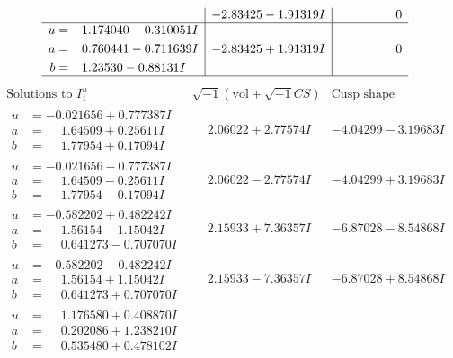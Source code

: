 \documentclass[1p]{elsarticle_modified}
\theoremstyle{definition}
\newcommand{\I}{\sqrt{-1}}
\begin{document}
$$\begin{array}{c|c|c}
 & -2.83425 - 1.91319 I & \phantom{-0.000000 } 0 \\ \hline\begin{aligned}
u &= -1.174040 - 0.310051 I \\
a &= \phantom{-}0.760441 - 0.711639 I \\
b &= \phantom{-}1.23530 - 0.88131 I\end{aligned}
 & -2.83425 + 1.91319 I & \phantom{-0.000000 } 0\\
 \hline 
 \end{array}$$\newpage$$\begin{array}{c|c|c}  
\text{Solutions to }I^u_{1}& \I (\text{vol} + \sqrt{-1}CS) & \text{Cusp shape}\\
 \hline 
\begin{aligned}
u &= -0.021656 + 0.777387 I \\
a &= \phantom{-}1.64509 + 0.25611 I \\
b &= \phantom{-}1.77954 + 0.17094 I\end{aligned}
 & \phantom{-}2.06022 + 2.77574 I & -4.04299 - 3.19683 I \\ \hline\begin{aligned}
u &= -0.021656 - 0.777387 I \\
a &= \phantom{-}1.64509 - 0.25611 I \\
b &= \phantom{-}1.77954 - 0.17094 I\end{aligned}
 & \phantom{-}2.06022 - 2.77574 I & -4.04299 + 3.19683 I \\ \hline\begin{aligned}
u &= -0.582202 + 0.482242 I \\
a &= \phantom{-}1.56154 - 1.15042 I \\
b &= \phantom{-}0.641273 - 0.707070 I\end{aligned}
 & \phantom{-}2.15933 + 7.36357 I & -6.87028 - 8.54868 I \\ \hline\begin{aligned}
u &= -0.582202 - 0.482242 I \\
a &= \phantom{-}1.56154 + 1.15042 I \\
b &= \phantom{-}0.641273 + 0.707070 I\end{aligned}
 & \phantom{-}2.15933 - 7.36357 I & -6.87028 + 8.54868 I \\ \hline\begin{aligned}
u &= \phantom{-}1.176580 + 0.408870 I \\
a &= \phantom{-}0.202086 + 1.238210 I \\
b &= \phantom{-}0.535480 + 0.478102 I\end{aligned}

\end{array}$$
\end{document}
